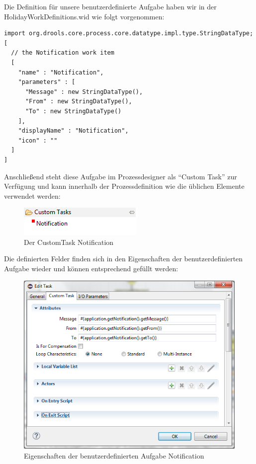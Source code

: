 Die Definition für unsere benutzerdefinierte Aufgabe haben wir in der HolidayWorkDefinitions.wid wie folgt vorgenommen:

\begin{lstlisting}
import org.drools.core.process.core.datatype.impl.type.StringDataType;
[
  // the Notification work item
  [
    "name" : "Notification",
    "parameters" : [
      "Message" : new StringDataType(),
      "From" : new StringDataType(),
      "To" : new StringDataType()
    ],
    "displayName" : "Notification",
    "icon" : ""
  ]
]
\end{lstlisting}

Anschließend steht diese Aufgabe im Prozessdesigner als "`Custom Task"' zur Verfügung und kann innerhalb der Prozessdefinition wie die üblichen Elemente verwendet werden:

\vspace{20pt}
\begin{figure}[H]
\centering
\includegraphics[width=0.4\linewidth]{Bilder/NotificationCustomTask}
\caption{Der CustomTask Notification}
\label{fig:NotificationCustomTask}
\end{figure}

Die definierten Felder finden sich in den Eigenschaften der benutzerdefinierten Aufgabe wieder und können entsprechend gefüllt werden:

\begin{figure}[H]
\centering
\includegraphics[width=0.8\linewidth]{Bilder/EditCustomTask}
\caption{Eigenschaften der benutzerdefinierten Aufgabe Notification}
\label{fig:EditCustomTask}
\end{figure}


